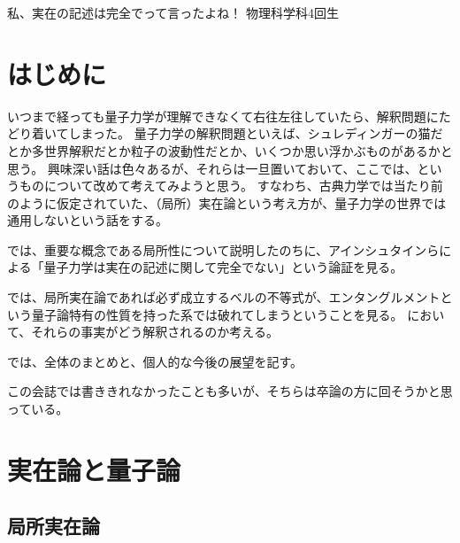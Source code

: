 \documentclass[10pt,b5paper,papersize,dvipdfmx]{jsbook}
\begin{document}

\renewcommand\textcolor[2]{#2} %

\newif\ifsecI
\newif\ifsecII

\secItrue
\secIItrue

\kaishititle%
  {私、実在の記述は完全でって言ったよね！}%
  {物理科学科4回生}%
  {}%

\section*{はじめに}
いつまで経っても量子力学が理解できなくて右往左往していたら、解釈問題にたどり着いてしまった。
量子力学の解釈問題といえば、シュレディンガーの猫だとか多世界解釈だとか粒子の波動性だとか、いくつか思い浮かぶものがあるかと思う。
興味深い話は色々あるが、それらは一旦置いておいて、ここでは、というものについて改めて考えてみようと思う。
すなわち、古典力学では当たり前のように仮定されていた、（局所）実在論という考え方が、量子力学の世界では通用しないという話をする。\par
{}では、重要な概念である局所性について説明したのちに、アインシュタインらによる「量子力学は実在の記述に関して完全でない」という論証を見る。\par
{}では、局所実在論であれば必ず成立するベルの不等式が、エンタングルメントという量子論特有の性質を持った系では破れてしまうということを見る。
において、それらの事実がどう解釈されるのか考える。\par
{}では、全体のまとめと、個人的な今後の展望を記す。\par

この会誌では書ききれなかったことも多いが、そちらは卒論の方に回そうかと思っている。


\ifsecI
\section{実在論と量子論}\label{sec:1}

%
\subsection{局所実在論} %
\end{document}
